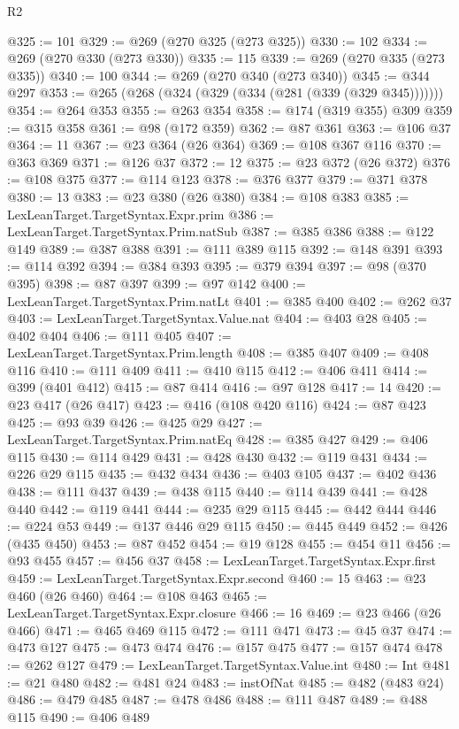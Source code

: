 \begin{lexlean}{R2}
\begin{coremodule}
{{{{{{{{{{{{{{{{{{{{{{{{{{{{{{{{{{{{{{{{{{{{{{{{{{{{{{{{{{{{{{{{{{{{{{{{{{{{{{{{{{{{{{{{{{{{{{{{{{{{{{{{{{{{{{{{{{{{{{{{{{{{{{{{{{{{{{{{{{{{@325 := 101
@329 := @269 (@270 @325 (@273 @325))
@330 := 102
@334 := @269 (@270 @330 (@273 @330))
@335 := 115
@339 := @269 (@270 @335 (@273 @335))
@340 := 100
@344 := @269 (@270 @340 (@273 @340))
@345 := @344 @297
@353 := @265 (@268 (@324 (@329 (@334 (@281 (@339 (@329 @345)))))))
@354 := @264 @353
@355 := @263 @354
@358 := @174 (@319 @355) @309
@359 := @315 @358
@361 := @98 (@172 @359)
@362 := @87 @361
@363 := @106 @37
@364 := 11
@367 := @23 @364 (@26 @364)
@369 := @108 @367 @116
@370 := @363 @369
@371 := @126 @37
@372 := 12
@375 := @23 @372 (@26 @372)
@376 := @108 @375
@377 := @114 @123
@378 := @376 @377
@379 := @371 @378
@380 := 13
@383 := @23 @380 (@26 @380)
@384 := @108 @383
@385 := LexLeanTarget.TargetSyntax.Expr.prim
@386 := LexLeanTarget.TargetSyntax.Prim.natSub
@387 := @385 @386
@388 := @122 @149
@389 := @387 @388
@391 := @111 @389 @115
@392 := @148 @391
@393 := @114 @392
@394 := @384 @393
@395 := @379 @394
@397 := @98 (@370 @395)
@398 := @87 @397
@399 := @97 @142
@400 := LexLeanTarget.TargetSyntax.Prim.natLt
@401 := @385 @400
@402 := @262 @37
@403 := LexLeanTarget.TargetSyntax.Value.nat
@404 := @403 @28
@405 := @402 @404
@406 := @111 @405
@407 := LexLeanTarget.TargetSyntax.Prim.length
@408 := @385 @407
@409 := @408 @116
@410 := @111 @409
@411 := @410 @115
@412 := @406 @411
@414 := @399 (@401 @412)
@415 := @87 @414
@416 := @97 @128
@417 := 14
@420 := @23 @417 (@26 @417)
@423 := @416 (@108 @420 @116)
@424 := @87 @423
@425 := @93 @39
@426 := @425 @29
@427 := LexLeanTarget.TargetSyntax.Prim.natEq
@428 := @385 @427
@429 := @406 @115
@430 := @114 @429
@431 := @428 @430
@432 := @119 @431
@434 := @226 @29 @115
@435 := @432 @434
@436 := @403 @105
@437 := @402 @436
@438 := @111 @437
@439 := @438 @115
@440 := @114 @439
@441 := @428 @440
@442 := @119 @441
@444 := @235 @29 @115
@445 := @442 @444
@446 := @224 @53
@449 := @137 @446 @29 @115
@450 := @445 @449
@452 := @426 (@435 @450)
@453 := @87 @452
@454 := @19 @128
@455 := @454 @11
@456 := @93 @455
@457 := @456 @37
@458 := LexLeanTarget.TargetSyntax.Expr.first
@459 := LexLeanTarget.TargetSyntax.Expr.second
@460 := 15
@463 := @23 @460 (@26 @460)
@464 := @108 @463
@465 := LexLeanTarget.TargetSyntax.Expr.closure
@466 := 16
@469 := @23 @466 (@26 @466)
@471 := @465 @469 @115
@472 := @111 @471
@473 := @45 @37
@474 := @473 @127
@475 := @473 @474
@476 := @157 @475
@477 := @157 @474
@478 := @262 @127
@479 := LexLeanTarget.TargetSyntax.Value.int
@480 := Int
@481 := @21 @480
@482 := @481 @24
@483 := instOfNat
@485 := @482 (@483 @24)
@486 := @479 @485
@487 := @478 @486
@488 := @111 @487
@489 := @488 @115
@490 := @406 @489
}}}}}}}}}}}}}}}}}}}}}}}}}}}}}}}}}}}}}}}}}}}}}}}}}}}}}}}}}}}}}}}}}}}}}}}}}}}}}}}}}}}}}}}}}}}}}}}}}}}}}}}}}}}}}}}}}}}}}}}}}}}}}}}}}}}}}}}}}}}}
\end{coremodule}
\end{lexlean}
